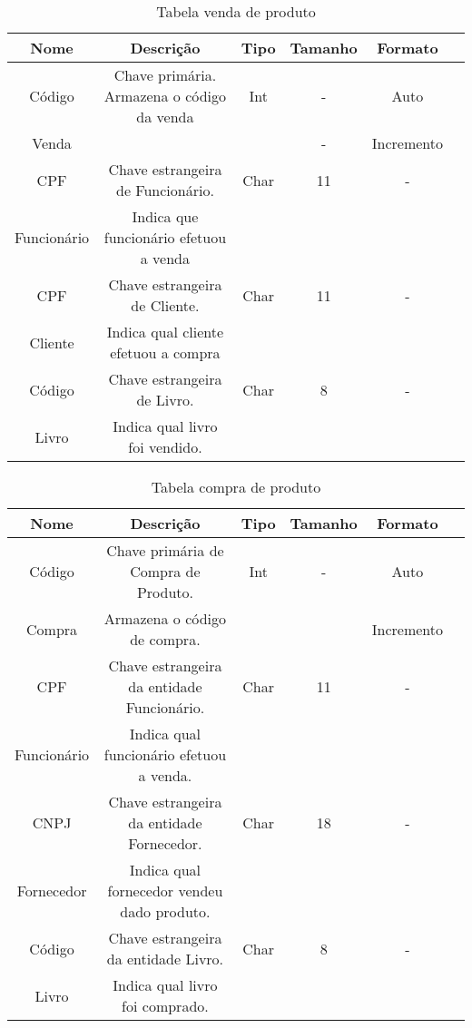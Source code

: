 %
%
\begin{table}[htbp]
\caption{Tabela venda de produto}
\begin{center}
\begin{tabular}{|c|c|c|c|c|c|}
\hline
Nome      & Descrição & Tipo & Tamanho & Formato \\ \hline
Código    & Chave primária. Armazena o código da venda & Int & - & Auto \\ 
Venda     &                                            &     & - & Incremento \\ \hline
CPF & Chave estrangeira de Funcionário.      & Char & 11 & - \\ 
Funcionário & Indica que funcionário efetuou a venda &       &    & \\ \hline
CPF  & Chave estrangeira de Cliente.        & Char & 11 & - \\ 
Cliente & Indica qual cliente efetuou a compra &       &    &  \\ \hline
Código  & Chave estrangeira de Livro.    & Char & 8 & - \\ 
Livro & Indica qual livro foi vendido. &       &   & \\ \hline
\end{tabular}
\end{center}
\label{tabela_venda_produto}
\end{table}
%
%
\begin{table}[htbp]
\caption{Tabela compra de produto}
\begin{center}
\begin{tabular}{|c|c|c|c|c|c|}
\hline
Nome & Descrição & Tipo & Tamanho & Formato \\ \hline
Código & Chave primária de Compra de Produto. & Int & - & Auto \\ 
Compra & Armazena o código de compra.         &         &   & Incremento\\ \hline
CPF  & Chave estrangeira da entidade Funcionário. & Char & 11 & - \\ 
Funcionário & Indica qual funcionário efetuou a venda.   &       &    &  \\ \hline
CNPJ & Chave estrangeira da entidade Fornecedor.    & Char & 18 & - \\ 
Fornecedor & Indica qual fornecedor vendeu dado produto. &       &    & \\ \hline
Código & Chave estrangeira da entidade Livro.& Char & 8 & - \\ 
Livro  & Indica qual livro foi comprado.     &       &   &   \\ \hline
\end{tabular}
\end{center}
\label{tabela_compra_produto}
\end{table}
%
%